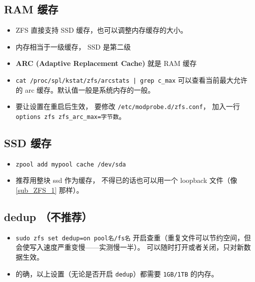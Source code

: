 \subsection{RAM 缓存}
\begin{itemize}
\item ZFS 直接支持 SSD 缓存，也可以调整内存缓存的大小。
\item 内存相当于一级缓存， SSD 是第二级
\item \textbf{ARC (Adaptive Replacement Cache) }就是 RAM 缓存
\item \verb`cat /proc/spl/kstat/zfs/arcstats | grep c_max` 可以查看当前最大允许的 arc 缓存。默认值一般是系统内存的一般。
\item 要让设置在重启后生效， 要修改 \verb`/etc/modprobe.d/zfs.conf`， 加入一行 \verb`options zfs zfs_arc_max=字节数`。 
\end{itemize}

\subsection{SSD 缓存}
\begin{itemize}
\item \verb`zpool add mypool cache /dev/sda`
\item 推荐用整块 ssd 作为缓存， 不得已的话也可以用一个 loopback 文件（像\autoref{sub_ZFS_1} 那样）。
\end{itemize}

\subsection{dedup （不推荐）}
\begin{itemize}
\item \verb|sudo zfs set dedup=on pool名/fs名| 开启查重（重复文件可以节约空间，但会使写入速度严重变慢——实测慢一半）。 可以随时打开或者关闭，只对新数据生效。
\item 的确，以上设置（无论是否开启 \verb|dedup|）都需要 \verb|1GB/1TB| 的内存。
\end{itemize}

